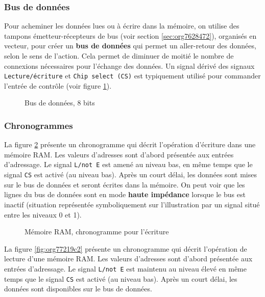 \documentclass[11pt]{article}
\begin{document}
\subsubsection{Bus de données}
\label{sec:org285eb26}

Pour acheminer les données lues ou à écrire dans la mémoire, on
utilise des tampons émetteur-récepteurs de bus (voir section \ref{sec:org7628472}), organisés en vecteur, pour créer un
\textbf{bus de données} qui permet un aller-retour des données, selon le sens
de l'action. Cela permet de diminuer de moitié le nombre de connexions
nécessaires pour l'échange des données.  Un signal dérivé des signaux
\texttt{Lecture/écriture} et \texttt{Chip select (CS)} est typiquement utilisé pour
commander l'entrée de contrôle (voir figure \ref{fig:org686c454}).

\begin{figure}[htbp]
\centering

\caption{\label{fig:org686c454}Bus de données, 8 bits}
\end{figure}

\subsubsection{Chronogrammes}
\label{sec:org8baa370}

La figure \ref{fig:orgeb396fe} présente un chronogramme qui décrit
l'opération d'écriture dans une mémoire RAM. Les valeurs d'adresses
sont d'abord présentée aux entrées d'adressage.  Le signal \texttt{L/not E}
est amené au niveau bas, en même temps que le signal \texttt{CS} est activé
(au niveau bas). Après un court délai, les données sont mises sur le
bus de données et seront écrites dans la mémoire. On peut voir que les
lignes du bus de données sont en mode \textbf{haute impédance} lorsque le bus
est inactif (situation représentée symboliquement sur l'illustration
par un signal situé entre les niveaux 0 et 1).

\begin{figure}[htbp]
\centering

\caption{\label{fig:orgeb396fe}Mémoire RAM, chronogramme pour l'écriture}
\end{figure}

La figure \ref{fig:org77219c2} présente un chronogramme qui décrit
l'opération de lecture d'une mémoire RAM. Les valeurs d'adresses sont
d'abord présentée aux entrées d'adressage.  Le signal \texttt{L/not E} est
maintenu au niveau élevé en même temps que le signal \texttt{CS} est activé
(au niveau bas). Après un court délai, les données sont disponibles sur
le bus de données.
\end{document}
